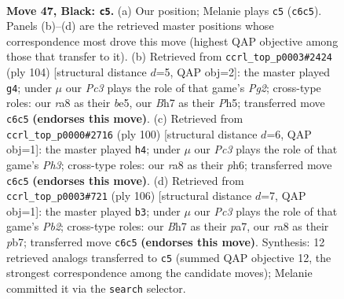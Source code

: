 \documentclass[11pt]{article}
\begin{document}
\clearpage

\begin{figure}[p]\centering
\begin{subfigure}{0.46\textwidth}\centering
\resizebox{\linewidth}{!}{%
\newchessgame
\chessboard[
  setfen={R7/7b/2p1k3/1p6/8/8/8/5K2 b - - 1 47},
  showmover=false,
  pgfstyle=straightmove, color=movearrow, markmove={c6-c5}
]}
\caption{}
\end{subfigure}\hfill
\begin{subfigure}{0.46\textwidth}\centering
\resizebox{\linewidth}{!}{%
\newchessgame
\chessboard[
  setfen={8/4k3/8/4b2P/2K5/5P2/6P1/8 w - - 0 53},
  showmover=false,
  pgfstyle=straightmove, color=movearrow, markmove={g2-g4}
]}
\caption{}
\end{subfigure}
\\[4pt]
\begin{subfigure}{0.46\textwidth}\centering
\resizebox{\linewidth}{!}{%
\newchessgame
\chessboard[
  setfen={8/3k4/7p/8/1K4P1/6bP/8/8 w - - 1 51},
  showmover=false,
  pgfstyle=straightmove, color=movearrow, markmove={h3-h4}
]}
\caption{}
\end{subfigure}\hfill
\begin{subfigure}{0.46\textwidth}\centering
\resizebox{\linewidth}{!}{%
\newchessgame
\chessboard[
  setfen={8/pp6/3k4/5K2/8/2P5/1P6/8 w - - 1 54},
  showmover=false,
  pgfstyle=straightmove, color=movearrow, markmove={b2-b3}
]}
\caption{}
\end{subfigure}
\caption{\textbf{Move 47, Black: \texttt{c5}.} (a) Our position; Melanie plays \texttt{c5} (\texttt{c6c5}). Panels (b)--(d) are the retrieved master positions whose correspondence most drove this move (highest QAP objective among those that transfer to it). (b) Retrieved from \texttt{ccrl\_top\_p0003\#2424} (ply 104) [structural distance $d$=5, QAP obj=2]: the master played \texttt{g4}; under $\mu$ our \emph{Pc3} plays the role of that game's \emph{Pg2}; cross-type roles: our \emph{r}a8 as their \emph{b}e5, our \emph{B}h7 as their \emph{P}h5; transferred move \texttt{c6c5} \textbf{(endorses this move)}. (c) Retrieved from \texttt{ccrl\_top\_p0000\#2716} (ply 100) [structural distance $d$=6, QAP obj=1]: the master played \texttt{h4}; under $\mu$ our \emph{Pc3} plays the role of that game's \emph{Ph3}; cross-type roles: our \emph{r}a8 as their \emph{p}h6; transferred move \texttt{c6c5} \textbf{(endorses this move)}. (d) Retrieved from \texttt{ccrl\_top\_p0003\#721} (ply 106) [structural distance $d$=7, QAP obj=1]: the master played \texttt{b3}; under $\mu$ our \emph{Pc3} plays the role of that game's \emph{Pb2}; cross-type roles: our \emph{B}h7 as their \emph{p}a7, our \emph{r}a8 as their \emph{p}b7; transferred move \texttt{c6c5} \textbf{(endorses this move)}. Synthesis: 12 retrieved analogs transferred to \texttt{c5} (summed QAP objective 12, the strongest correspondence among the candidate moves); Melanie committed it via the \texttt{search} selector.}
\label{fig:thought-m93}
\end{figure}
\end{document}
